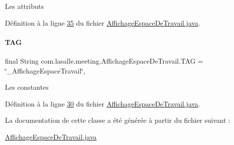 Les attributs 

Définition à la ligne \hyperlink{_affichage_espace_de_travail_8java_source_l00035}{35} du fichier \hyperlink{_affichage_espace_de_travail_8java_source}{Affichage\+Espace\+De\+Travail.\+java}.

\mbox{\label{classcom_1_1lasalle_1_1meeting_1_1_affichage_espace_de_travail_a8606eb11c7b28f52226544de431d86a4}} 
\paragraph{\texorpdfstring{T\+AG}{TAG}}
{\footnotesize\ttfamily final String com.\+lasalle.\+meeting.\+Affichage\+Espace\+De\+Travail.\+T\+AG = \char`\"{}\+\_\+\+Affichage\+Espace\+Travail\char`\"{}\hspace{0.3cm}{\ttfamily [static]}, {\ttfamily [private]}}

Les constantes 

Définition à la ligne \hyperlink{_affichage_espace_de_travail_8java_source_l00030}{30} du fichier \hyperlink{_affichage_espace_de_travail_8java_source}{Affichage\+Espace\+De\+Travail.\+java}.



La documentation de cette classe a été générée à partir du fichier suivant \+:\begin{DoxyCompactItemize}
\item 
\hyperlink{_affichage_espace_de_travail_8java}{Affichage\+Espace\+De\+Travail.\+java}\end{DoxyCompactItemize}
